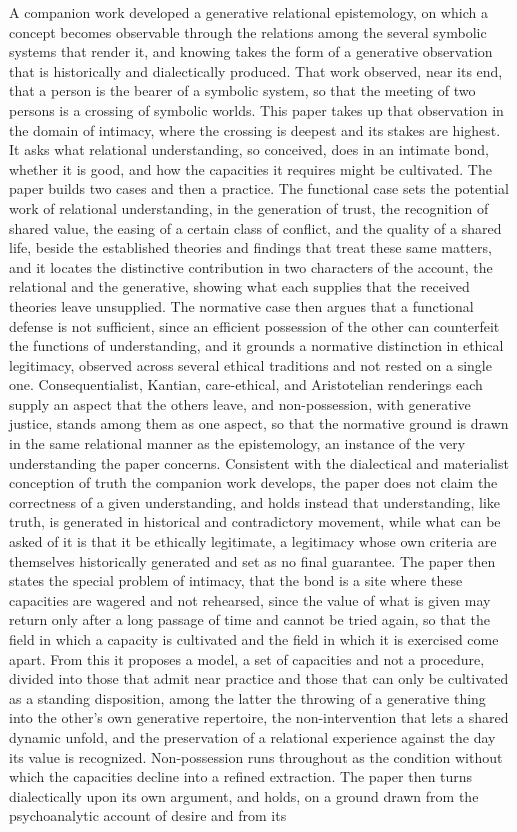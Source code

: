 \noindent A companion work developed a generative relational epistemology, on which a concept becomes observable through the relations among the several symbolic systems that render it, and knowing takes the form of a generative observation that is historically and dialectically produced. That work observed, near its end, that a person is the bearer of a symbolic system, so that the meeting of two persons is a crossing of symbolic worlds. This paper takes up that observation in the domain of intimacy, where the crossing is deepest and its stakes are highest. It asks what relational understanding, so conceived, does in an intimate bond, whether it is good, and how the capacities it requires might be cultivated. The paper builds two cases and then a practice. The functional case sets the potential work of relational understanding, in the generation of trust, the recognition of shared value, the easing of a certain class of conflict, and the quality of a shared life, beside the established theories and findings that treat these same matters, and it locates the distinctive contribution in two characters of the account, the relational and the generative, showing what each supplies that the received theories leave unsupplied. The normative case then argues that a functional defense is not sufficient, since an efficient possession of the other can counterfeit the functions of understanding, and it grounds a normative distinction in ethical legitimacy, observed across several ethical traditions and not rested on a single one. Consequentialist, Kantian, care-ethical, and Aristotelian renderings each supply an aspect that the others leave, and non-possession, with generative justice, stands among them as one aspect, so that the normative ground is drawn in the same relational manner as the epistemology, an instance of the very understanding the paper concerns. Consistent with the dialectical and materialist conception of truth the companion work develops, the paper does not claim the correctness of a given understanding, and holds instead that understanding, like truth, is generated in historical and contradictory movement, while what can be asked of it is that it be ethically legitimate, a legitimacy whose own criteria are themselves historically generated and set as no final guarantee. The paper then states the special problem of intimacy, that the bond is a site where these capacities are wagered and not rehearsed, since the value of what is given may return only after a long passage of time and cannot be tried again, so that the field in which a capacity is cultivated and the field in which it is exercised come apart. From this it proposes a model, a set of capacities and not a procedure, divided into those that admit near practice and those that can only be cultivated as a standing disposition, among the latter the throwing of a generative thing into the other's own generative repertoire, the non-intervention that lets a shared dynamic unfold, and the preservation of a relational experience against the day its value is recognized. Non-possession runs throughout as the condition without which the capacities decline into a refined extraction. The paper then turns dialectically upon its own argument, and holds, on a ground drawn from the psychoanalytic account of desire and from its 